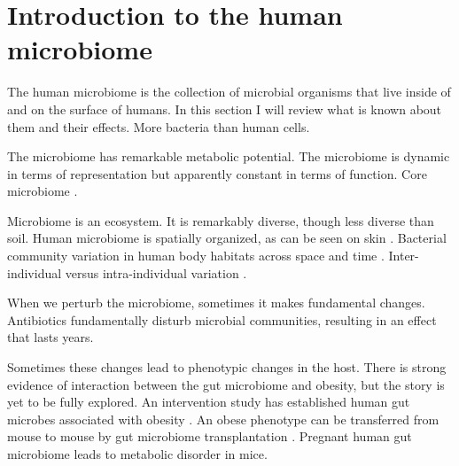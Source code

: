 \documentclass{amsart}
\begin{document}
\section{Introduction to the human microbiome}

The human microbiome is the collection of microbial organisms that live inside of and on the surface of humans.
In this section I will review what is known about them and their effects.
More bacteria than human cells.

The microbiome has remarkable metabolic potential.
\cite{qin2010human}
The microbiome is dynamic in terms of representation but apparently constant in terms of function.
\cite{hmp2012structure}
Core microbiome \cite{turnbaugh2008core}.

Microbiome is an ecosystem.
It is remarkably diverse, though less diverse than soil.
Human microbiome is spatially organized, as can be seen on skin \cite{grice2009topographical}.
Bacterial community variation in human body habitats across space and time \cite{costello2009bacterial}.
Inter-individual versus intra-individual variation \cite{hmp2012structure}.

When we perturb the microbiome, sometimes it makes fundamental changes.
Antibiotics fundamentally disturb microbial communities, resulting in an effect that lasts years.
\cite{jernberg2007long,dethlefsen2008pervasive,jakobsson2010short,dethlefsen2011incomplete}

Sometimes these changes lead to phenotypic changes in the host.
There is strong evidence of interaction between the gut microbiome and obesity, but the story is yet to be fully explored.
An intervention study has established human gut microbes associated with obesity \cite{ley2006microbial}.
An obese phenotype can be transferred from mouse to mouse by gut microbiome transplantation \cite{turnbaugh2006obesity}.
Pregnant human gut microbiome \cite{koren2012host} leads to metabolic disorder in mice.
\end{document}
